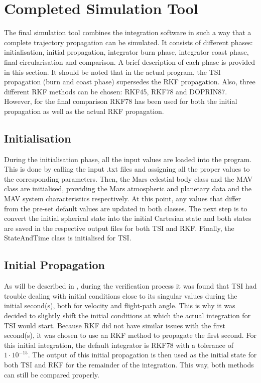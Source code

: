 \section{Completed Simulation Tool}
\label{sec:completedSimulationTool}
The final simulation tool combines the integration software in such a way that a complete trajectory propagation can be simulated. It consists of different phases: initialisation, initial propagation, integrator burn phase, integrator coast phase, final circularisation and comparison. A brief description of each phase is provided in this section. It should be noted that in the actual program, the \ac{TSI} propagation (burn and coast phase) supersedes the \ac{RKF} propagation. Also, three different \ac{RKF} methods can be chosen: \ac{RKF45}, \ac{RKF78} and  \ac{DOPRIN87}. However, for the final comparison \ac{RKF78} has been used for both the initial propagation as well as the actual \ac{RKF} propagation.

\subsection{Initialisation}
\label{subsec:initialisation}
During the initialisation phase, all the input values are loaded into the program. This is done by calling the input .txt files and assigning all the proper values to the corresponding parameters. Then, the Mars celestial body class and the \ac{MAV} class are initialised, providing the Mars atmospheric and planetary data and the \ac{MAV} system characteristics respectively. At this point, any values that differ from the pre-set default values are updated in both classes. The next step is to convert the initial spherical state into the initial Cartesian state and both states are saved in the respective output files for both \ac{TSI} and \ac{RKF}. Finally, the StateAndTime class is initialised for \ac{TSI}.

\subsection{Initial Propagation}
\label{subsec:initialPropagation}
As will be described in , during the verification process it was found that \ac{TSI} had trouble dealing with initial conditions close to its singular values during the initial second(s), both for velocity and flight-path angle. This is why it was decided to slightly shift the initial conditions at which the actual integration for \ac{TSI} would start. Because \ac{RKF} did not have similar issues with the first second(s), it was chosen to use an \ac{RKF} method to propagate the first second. For this initial integration, the default integrator is \ac{RKF78} with a tolerance of $1\cdot 10^{-15}$. The output of this initial propagation is then used as the initial state for both \ac{TSI} and \ac{RKF} for the remainder of the integration. This way, both methods can still be compared properly. 


